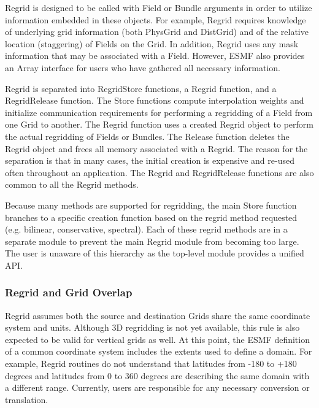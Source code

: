 

Regrid is designed to be called with Field or Bundle
arguments in order to utilize information embedded in
these objects.  For example, Regrid requires knowledge
of underlying grid information (both PhysGrid and DistGrid)
and of the relative location (staggering) of Fields on
the Grid.  In addition, Regrid uses any mask information
that may be associated with a Field.  However, ESMF also
provides an Array interface for users who have gathered all
necessary information.

Regrid is separated into RegridStore functions, a Regrid
function, and a RegridRelease function. The Store functions
compute interpolation weights and initialize communication
requirements for performing a regridding of a Field
from one Grid to another.  The Regrid function uses
a created Regrid object to perform the actual regridding
of Fields or Bundles.  The Release function deletes the
Regrid object and frees all memory associated with a Regrid.
The reason for the separation is that in many cases, the
initial creation is expensive and re-used often throughout
an application.  The Regrid and RegridRelease functions are
also common to all the Regrid methods.

Because many methods are supported for regridding,
the main Store function branches to a specific
creation function based on the regrid method requested
(e.g. bilinear, conservative, spectral).  Each of
these regrid methods are in a separate module to
prevent the main Regrid module from becoming too
large.  The user is unaware of this hierarchy as the
top-level module provides a unified API.

\subsubsection{Regrid and Grid Overlap}

Regrid assumes both the source and destination Grids share the same coordinate
system and units.  Although 3D regridding is not yet available, this rule is
also expected to be valid for vertical grids as well.  At this point, the ESMF
definition of a common coordinate system includes the extents used to define
a domain.  For example, Regrid routines do not understand that latitudes from
-180 to +180 degrees and latitudes from 0 to 360 degrees are describing the
same domain with a different range.  Currently, users are responsible for any
necessary conversion or translation.  

